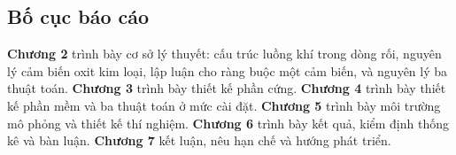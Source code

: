 \subsection{Bố cục báo cáo}
\textbf{Chương 2} trình bày cơ sở lý thuyết: cấu trúc luồng khí trong dòng rối, nguyên lý cảm biến oxit kim loại, lập luận cho ràng buộc một cảm biến, và nguyên lý ba thuật toán. \textbf{Chương 3} trình bày thiết kế phần cứng. \textbf{Chương 4} trình bày thiết kế phần mềm và ba thuật toán ở mức cài đặt. \textbf{Chương 5} trình bày môi trường mô phỏng và thiết kế thí nghiệm. \textbf{Chương 6} trình bày kết quả, kiểm định thống kê và bàn luận. \textbf{Chương 7} kết luận, nêu hạn chế và hướng phát triển.
